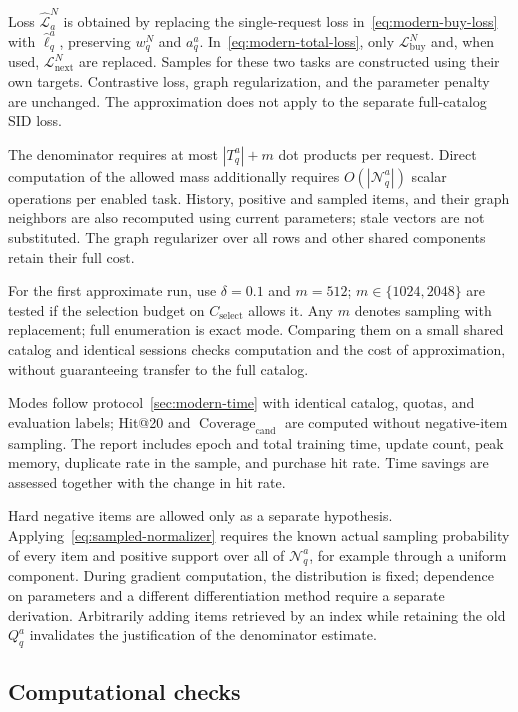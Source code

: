 \documentclass[12pt,a4paper]{article}
\theoremstyle{plainru}
\begin{document}
Loss $\widehat{\mathcal L}_a^N$ is obtained by replacing
the single-request loss in~\eqref{eq:modern-buy-loss}
with $\widehat\ell_q^a$, preserving $w_q^N$ and $a_q^a$.
In~\eqref{eq:modern-total-loss}, only
$\mathcal L_{\mathrm{buy}}^N$ and, when used,
$\mathcal L_{\mathrm{next}}^N$ are replaced.
Samples for these two tasks are constructed using their own targets.
Contrastive loss, graph regularization, and the parameter penalty are unchanged.
The approximation does not apply to the separate full-catalog SID loss.

The denominator requires at most $|T_q^a|+m$ dot products per request.
Direct computation of the allowed mass additionally requires
$O(|\mathcal N_q^a|)$ scalar operations per enabled task.
History, positive and sampled items, and their graph neighbors
are also recomputed using current parameters; stale
vectors are not substituted. The graph regularizer over all rows
and other shared components retain their full cost.

For the first approximate run, use $\delta=0.1$ and $m=512$;
$m\in\{1024,2048\}$ are tested if the selection budget on $C_{\mathrm{select}}$ allows it.
Any $m$ denotes sampling with replacement; full enumeration is exact mode.
Comparing them on a small shared catalog and identical sessions checks
computation and the cost of approximation, without guaranteeing transfer to the full catalog.

Modes follow protocol~\ref{sec:modern-time} with identical catalog,
quotas, and evaluation labels; Hit@20 and $\operatorname{Coverage}_{\mathrm{cand}}$
are computed without negative-item sampling.
The report includes epoch and total training time, update count,
peak memory, duplicate rate in the sample, and purchase hit rate.
Time savings are assessed together with the change in hit rate.

Hard negative items are allowed only as a separate hypothesis.
Applying~\eqref{eq:sampled-normalizer} requires the known actual
sampling probability of every item and positive support over all of
$\mathcal N_q^a$, for example through a uniform component. During gradient
computation, the distribution is fixed; dependence on parameters
and a different differentiation method require a separate derivation.
Arbitrarily adding items retrieved by an index while retaining the old $Q_q^a$
invalidates the justification of the denominator estimate.

\subsection{Computational checks}
\label{sec:sampled-checks}
\end{document}
